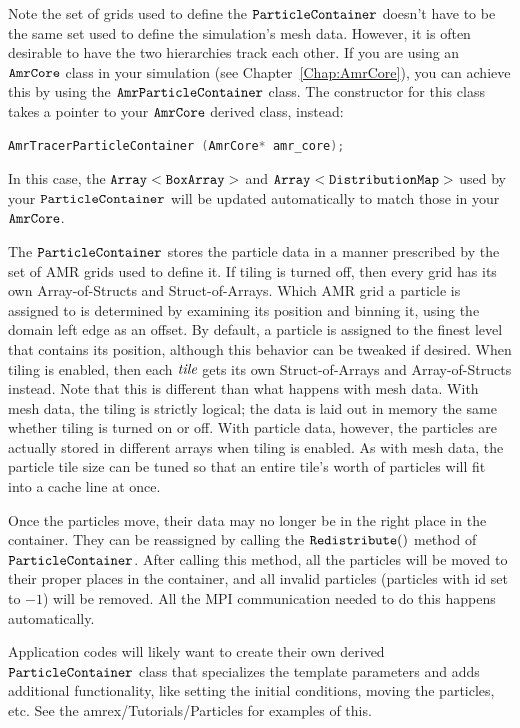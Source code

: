 Note the set of grids used to define the $\tt{ParticleContainer}$ doesn't have to be the same set used to define the simulation's mesh data. However, it is often desirable to have
the two hierarchies track each other. If you are using an $\tt{AmrCore}$ class in your simulation (see Chapter~\ref{Chap:AmrCore}), you can achieve this by using 
the $\tt{AmrParticleContainer}$ class. The constructor for this class takes a pointer to your $\tt{AmrCore}$ derived class, instead:

\begin{lstlisting}[language=cpp]
  AmrTracerParticleContainer (AmrCore* amr_core);
\end{lstlisting}

In this case, the $\tt{Array<BoxArray>}$ and $\tt{Array<DistributionMap>}$ used by your $\tt{ParticleContainer}$ will be updated automatically to match those in
your $\tt{AmrCore}$. 

The $\tt{ParticleContainer}$ stores the particle data in a manner prescribed by the set of AMR grids used to define it. If tiling is turned off, then every grid has its own 
Array-of-Structs and Struct-of-Arrays. Which AMR grid a particle is assigned to is determined by examining its position and binning it, using the domain left edge as an offset. 
By default, a particle is assigned to the finest level that contains its position, although this behavior can be tweaked if desired. 
When tiling is enabled, then each $\emph{tile}$ gets its own Struct-of-Arrays and Array-of-Structs instead. Note that this is different than what happens with mesh data. With mesh data, the tiling is strictly logical; the data is laid out in memory the same whether tiling is turned on or off. With particle data, however, the particles are actually stored in different arrays when tiling is enabled. As with mesh data, the particle tile size can be tuned so that an entire tile's worth of particles will fit into a cache line at once.

Once the particles move, their data may no longer be in the right place in the container. They can be reassigned by calling the $\tt{Redistribute()}$ method of $\tt{ParticleContainer}$.
After calling this method, all the particles will be moved to their proper places in the container, and all invalid particles (particles with id set to $-1$) will be removed. All the 
MPI communication needed to do this happens automatically.

Application codes will likely want to create their own derived $\tt{ParticleContainer}$ class that specializes the template parameters and adds additional 
functionality, like setting the initial conditions, moving the particles, etc. See the amrex/Tutorials/Particles for examples of this.

